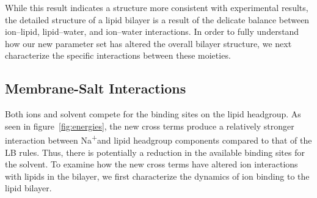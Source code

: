 \documentclass[12pt,openany,final]{book}
\newcommand{\na}{Na\textsuperscript{+}}
\begin{document}
While this result indicates a structure more consistent with experimental results, 
the detailed structure of a lipid bilayer is a result of the
delicate balance between ion--lipid, lipid--water, and ion--water interactions.
In order to fully understand how our new parameter set has altered the
overall bilayer structure, we next characterize the specific interactions
between these moieties.

\subsection{Membrane-Salt Interactions}

Both ions and solvent compete for the binding sites on the lipid headgroup. 
As seen in figure~\ref{fig:energies}, the new cross terms
produce a relatively stronger interaction between \na and lipid
headgroup components compared to that of the LB rules. 
Thus, there is potentially a reduction in the available binding sites for the solvent. 
To examine how the new cross terms have altered ion interactions with lipids in the bilayer, 
we first characterize the dynamics of ion binding to the lipid bilayer.
\end{document}
